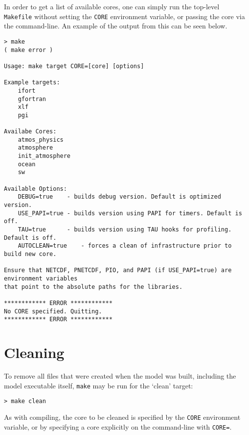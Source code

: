 In order to get a list of available cores, one can simply run the top-level {\tt
Makefile} without setting the {\tt CORE} environment variable, or passing the
core via the command-line. An example of the output from this can be seen
below.

{\small
\begin{verbatim}
> make
( make error )

Usage: make target CORE=[core] [options]

Example targets:
    ifort
    gfortran
    xlf
    pgi

Availabe Cores:
    atmos_physics
    atmosphere
    init_atmosphere
    ocean
    sw

Available Options:
    DEBUG=true    - builds debug version. Default is optimized version.
    USE_PAPI=true - builds version using PAPI for timers. Default is off.
    TAU=true      - builds version using TAU hooks for profiling. Default is off.
    AUTOCLEAN=true    - forces a clean of infrastructure prior to build new core.

Ensure that NETCDF, PNETCDF, PIO, and PAPI (if USE_PAPI=true) are environment variables
that point to the absolute paths for the libraries.

************ ERROR ************
No CORE specified. Quitting.
************ ERROR ************
\end{verbatim}
}

\section{Cleaning}

To remove all files  that were created when the model was built,
including the model executable itself, {\tt make} may be run for the
`clean' target:

\vspace{12pt}
{\tt > make clean}
\vspace{12pt}

As with compiling, the core to be cleaned is specified by the {\tt CORE}
environment variable, or by specifying a core explicitly on the
command-line with {\tt CORE=}.
